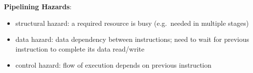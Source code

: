 \documentclass[12pt,twoside]{article}
\begin{document}
\textbf{Pipelining Hazards}:
\begin{itemize}
  \item structural hazard: a required resource is busy (e.g.\ needed in multiple stages) 
  \item data hazard: data dependency between instructions; need to wait for previous instruction to complete its data read/write
  \item control hazard: flow of execution depends on previous instruction
\end{itemize}
\end{document}
